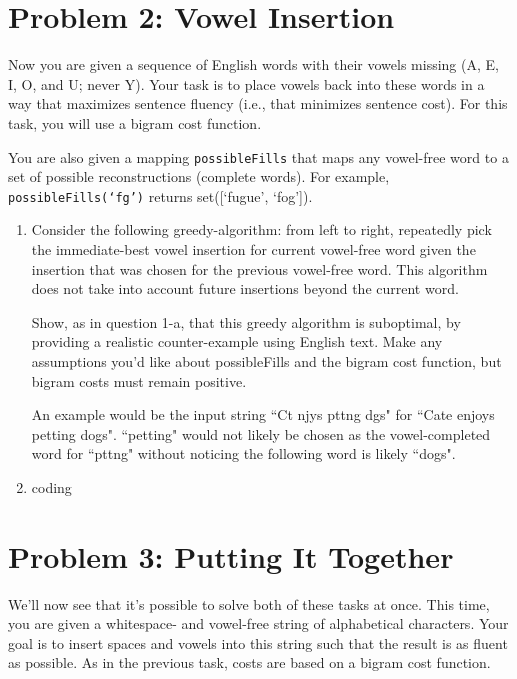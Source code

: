 \documentclass[10pt]{article}
\begin{document}
\section*{\normalsize Problem 2: Vowel Insertion}

Now you are given a sequence of English words with their vowels missing (A, E, I, O, and U; never Y). Your task is to place vowels back into these words in a way that maximizes sentence fluency (i.e., that minimizes sentence cost). For this task, you will use a bigram cost function.
\smallskip

You are also given a mapping \texttt{possibleFills} that maps any vowel-free word to a set of possible reconstructions (complete words). For example, \texttt{possibleFills(`fg')} returns set([`fugue', `fog']). 

\begin{enumerate}[label=(\alph*)]

  \item  Consider the following greedy-algorithm: from left to right, repeatedly pick the immediate-best vowel insertion for current vowel-free word given the insertion that was chosen for the previous vowel-free word. This algorithm does not take into account future insertions beyond the current word.

Show, as in question 1-a, that this greedy algorithm is suboptimal, by providing a realistic counter-example using English text. Make any assumptions you'd like about possibleFills and the bigram cost function, but bigram costs must remain positive.

	An example would be the input string ``Ct njys pttng dgs" for ``Cate enjoys petting dogs". ``petting" would not likely be chosen as the vowel-completed word for ``pttng" without noticing the following word is likely ``dogs".
  
  \item coding

\end{enumerate}

\section*{\normalsize Problem 3: Putting It Together}

We'll now see that it's possible to solve both of these tasks at once. This time, you are given a whitespace- and vowel-free string of alphabetical characters. Your goal is to insert spaces and vowels into this string such that the result is as fluent as possible. As in the previous task, costs are based on a bigram cost function.
\end{document}
